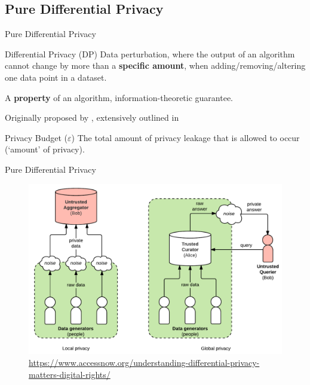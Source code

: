 \documentclass[12pt,aspectratio=169]{beamer}
\begin{document}
\subsection{Pure Differential Privacy}


\begin{frame}{Pure Differential Privacy}

\begin{block}{Differential Privacy (DP)}
Data perturbation, where the output of an algorithm cannot change by more than a \textbf{specific amount}, when adding/removing/altering one data point in a dataset.

A \textbf{property} of an algorithm, information-theoretic guarantee.

Originally proposed by \citet{dwork2006calibrating}, extensively outlined in \citet{Dwork.Roth.2013}
\end{block}

\begin{block}{Privacy Budget ($\varepsilon$)}
The total amount of privacy leakage that is allowed to occur (`amount' of privacy).
\end{block}

\end{frame}

\begin{frame}{Pure Differential Privacy}

\begin{figure}
    \centering
    \includegraphics[width=0.7\linewidth]{figures/local-vs-global.png}
    \caption{\tiny \url{https://www.accessnow.org/understanding-differential-privacy-matters-digital-rights/}}
\end{figure}

\end{frame}
\end{document}
